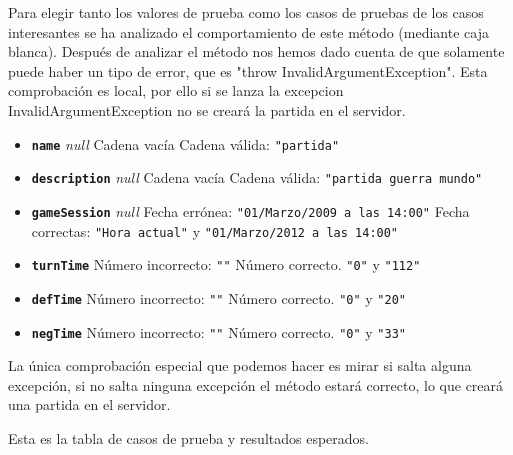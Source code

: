 Para elegir tanto los valores de prueba como los casos de pruebas de los casos interesantes se ha analizado el comportamiento de este método (mediante caja blanca). Después de analizar el método nos hemos dado cuenta de que solamente puede haber un tipo de error, que es "throw InvalidArgumentException". Esta comprobación es local, por ello si se lanza la excepcion InvalidArgumentException no se creará la partida en el servidor.

\begin{itemize}
\item \textbf{\texttt{name}}
\subitem \textit{null}
\subitem Cadena vacía
\subitem Cadena válida: \texttt{"partida"}

\item \textbf{\texttt{description}}
\subitem \textit{null}
\subitem Cadena vacía
\subitem Cadena válida: \texttt{"partida guerra mundo"}

\item \textbf{\texttt{gameSession}}
\subitem \textit{null}
\subitem Fecha errónea: \texttt{"01/Marzo/2009 a las 14:00"}
\subitem Fecha correctas: \texttt{"Hora actual"} y \texttt{"01/Marzo/2012 a las 14:00"}

\item \textbf{\texttt{turnTime}}
\subitem Número incorrecto: \texttt{""}
\subitem Número correcto. \texttt{"0"} y \texttt{"112"}

\item \textbf{\texttt{defTime}}
\subitem Número incorrecto: \texttt{""}
\subitem Número correcto. \texttt{"0"} y \texttt{"20"}

\item \textbf{\texttt{negTime}}
\subitem Número incorrecto: \texttt{""}
\subitem Número correcto. \texttt{"0"} y \texttt{"33"}
\end{itemize}

La única comprobación especial que podemos hacer es mirar si salta alguna excepción, si no salta ninguna excepción el método estará correcto, lo que creará una partida en el servidor.

Esta es la tabla de casos de prueba y resultados esperados.

